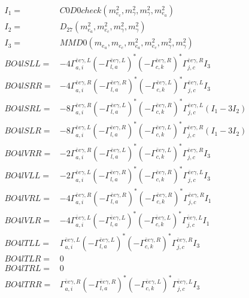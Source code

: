 \documentclass[A4,landscape]{article}
\begin{document}
\begin{align} 
I_1 = & C0D0check(m^2_{e_{{c}}}, m^2_{\gamma}, m^2_{\gamma}, m^2_{e_{{a}}}) \\ 
I_2 = & D_{27}(m^2_{e_{{a}}}, m^2_{e_{{c}}}, m^2_{\gamma}, m^2_{\gamma}) \\ 
I_3 = & MMD0(m_{e_{{a}}}, m_{e_{{c}}}, m^2_{e_{{a}}}, m^2_{e_{{c}}}, m^2_{\gamma}, m^2_{\gamma}) \\ 
  BO4lSLL= & -4  \Gamma^{\bar{e}e \gamma ,L}_{a, i} (- \Gamma^{\bar{e}e \gamma ,L} _{l, a})^* (- \Gamma^{\bar{e}e \gamma ,R} _{c, k})^* \Gamma^{\bar{e}e \gamma ,R}_{j, c} I_3 \\ 
  BO4lSRR= & -4  \Gamma^{\bar{e}e \gamma ,R}_{a, i} (- \Gamma^{\bar{e}e \gamma ,R} _{l, a})^* (- \Gamma^{\bar{e}e \gamma ,L} _{c, k})^* \Gamma^{\bar{e}e \gamma ,L}_{j, c} I_3 \\ 
  BO4lSRL= & -8  \Gamma^{\bar{e}e \gamma ,R}_{a, i} (- \Gamma^{\bar{e}e \gamma ,L} _{l, a})^* (- \Gamma^{\bar{e}e \gamma ,R} _{c, k})^* \Gamma^{\bar{e}e \gamma ,L}_{j, c} (I_1 - 3 I_2) \\ 
  BO4lSLR= & -8  \Gamma^{\bar{e}e \gamma ,L}_{a, i} (- \Gamma^{\bar{e}e \gamma ,R} _{l, a})^* (- \Gamma^{\bar{e}e \gamma ,L} _{c, k})^* \Gamma^{\bar{e}e \gamma ,R}_{j, c} (I_1 - 3 I_2) \\ 
  BO4lVRR= & -2  \Gamma^{\bar{e}e \gamma ,R}_{a, i} (- \Gamma^{\bar{e}e \gamma ,L} _{l, a})^* (- \Gamma^{\bar{e}e \gamma ,L} _{c, k})^* \Gamma^{\bar{e}e \gamma ,R}_{j, c} I_3 \\ 
  BO4lVLL= & -2  \Gamma^{\bar{e}e \gamma ,L}_{a, i} (- \Gamma^{\bar{e}e \gamma ,R} _{l, a})^* (- \Gamma^{\bar{e}e \gamma ,R} _{c, k})^* \Gamma^{\bar{e}e \gamma ,L}_{j, c} I_3 \\ 
  BO4lVRL= & -4  \Gamma^{\bar{e}e \gamma ,R}_{a, i} (- \Gamma^{\bar{e}e \gamma ,R} _{l, a})^* (- \Gamma^{\bar{e}e \gamma ,R} _{c, k})^* \Gamma^{\bar{e}e \gamma ,R}_{j, c} I_1 \\ 
  BO4lVLR= & -4  \Gamma^{\bar{e}e \gamma ,L}_{a, i} (- \Gamma^{\bar{e}e \gamma ,L} _{l, a})^* (- \Gamma^{\bar{e}e \gamma ,L} _{c, k})^* \Gamma^{\bar{e}e \gamma ,L}_{j, c} I_1 \\ 
  BO4lTLL= &  \Gamma^{\bar{e}e \gamma ,L}_{a, i} (- \Gamma^{\bar{e}e \gamma ,L} _{l, a})^* (- \Gamma^{\bar{e}e \gamma ,R} _{c, k})^* \Gamma^{\bar{e}e \gamma ,R}_{j, c} I_3 \\ 
  BO4lTLR= & 0 \\ 
  BO4lTRL= & 0 \\ 
  BO4lTRR= &  \Gamma^{\bar{e}e \gamma ,R}_{a, i} (- \Gamma^{\bar{e}e \gamma ,R} _{l, a})^* (- \Gamma^{\bar{e}e \gamma ,L} _{c, k})^* \Gamma^{\bar{e}e \gamma ,L}_{j, c} I_3 \\ 
\end{align} 
\end{document}
